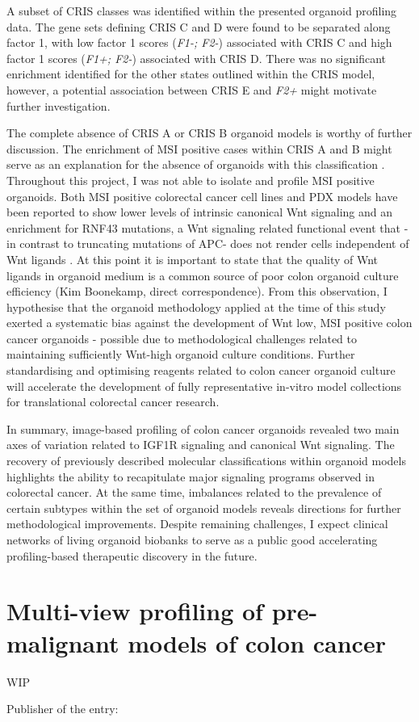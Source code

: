 \begin{flushleft}
A subset of CRIS classes was identified within the presented organoid profiling data. The gene sets defining CRIS C and D were found to be separated along factor 1, with low factor 1 scores (\textit{F1-; F2-}) associated with CRIS C and high factor 1 scores (\textit{F1+; F2-}) associated with CRIS D. There was no significant enrichment identified for the other states outlined within the CRIS model, however, a potential association between CRIS E and \textit{F2+} might motivate further investigation.

The complete absence of CRIS A or CRIS B organoid models is worthy of further discussion. The enrichment of MSI positive cases within CRIS A and B might serve as an explanation for the absence of organoids with this classification \cite{isellaSelectiveAnalysisCancercell2017a}. Throughout this project, I was not able to isolate and profile MSI positive organoids. Both MSI positive colorectal cancer cell lines \cite{imkellerMetabolicBalanceColorectal2022} and PDX models \citep{isellaSelectiveAnalysisCancercell2017a} have been reported to show lower levels of intrinsic canonical Wnt signaling and an enrichment for RNF43 mutations, a Wnt signaling related functional event that -in contrast to truncating mutations of APC- does not render cells independent of Wnt ligands \cite{vandeweteringProspectiveDerivationLiving2015}. At this point it is important to state that the quality of Wnt ligands in organoid medium is a common source of poor colon organoid culture efficiency (Kim Boonekamp, direct correspondence). From this observation, I hypothesise that the organoid methodology applied at the time of this study exerted a systematic bias against the development of Wnt low, MSI positive colon cancer organoids - possible due to methodological challenges related to maintaining sufficiently Wnt-high organoid culture conditions. Further standardising and optimising reagents related to colon cancer organoid culture will accelerate the development of fully representative in-vitro model collections for translational colorectal cancer research. 

In summary, image-based profiling of colon cancer organoids revealed two main axes of variation related to IGF1R signaling and canonical Wnt signaling. The recovery of previously described molecular classifications within organoid models highlights the ability to recapitulate major signaling programs observed in colorectal cancer. At the same time, imbalances related to the prevalence of certain subtypes within the set of organoid models reveals directions for further methodological improvements. Despite remaining challenges, I expect clinical networks of living organoid biobanks to serve as a public good accelerating profiling-based therapeutic discovery in the future. 

\section{Multi-view profiling of pre-malignant models of colon cancer}

WIP

Publisher of the entry: 


\end{flushleft}